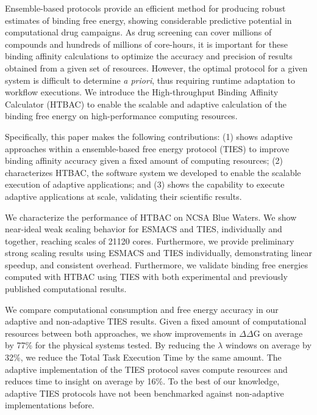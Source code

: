 Ensemble-based protocols provide an efficient method for producing robust
estimates of binding free energy, showing considerable predictive potential in
computational drug campaigns. As drug screening can cover millions of
compounds and hundreds of millions of core-hours, it is important for these
binding affinity calculations to optimize the accuracy and precision of
results obtained from a given set of resources. However, the optimal protocol
for a given system is difficult to determine {\it a priori}, thus requiring
runtime adaptation to workflow executions. We introduce the High-throughput
Binding Affinity Calculator (HTBAC) to enable the scalable and adaptive
calculation of the binding free energy on high-performance computing
resources.


Specifically, this paper makes the following contributions: (1) shows
adaptive approaches within a ensemble-based free energy protocol (TIES) to
improve binding affinity accuracy given a fixed amount of computing
resources; (2) characterizes HTBAC, the software system we developed to
enable the scalable execution of adaptive applications; and (3) shows the
capability to execute adaptive applications at scale, validating their
scientific results.

We characterize the performance of HTBAC on NCSA Blue Waters. We show
near-ideal weak scaling behavior for ESMACS and TIES, individually and
together, reaching scales of 21120 cores. Furthermore, we provide preliminary
strong scaling results using ESMACS and TIES individually, demonstrating
linear speedup, and consistent overhead. Furthermore, we validate binding
free energies computed with HTBAC using TIES with both experimental and
previously published computational results.


We compare computational consumption and free energy accuracy in our adaptive
and non-adaptive TIES results. Given a fixed amount of computational resources
between both approaches, we show improvements in $\Delta \Delta$G on average
by 77\% for the physical systems tested. By reducing the $\lambda$ windows on
average by 32\%, we reduce the Total Task Execution Time by the same amount.
The adaptive implementation of the TIES protocol saves compute resources and
reduces time to insight on average by 16\%. To the best of our knowledge,
adaptive TIES protocols have not been benchmarked against non-adaptive
implementations before.

